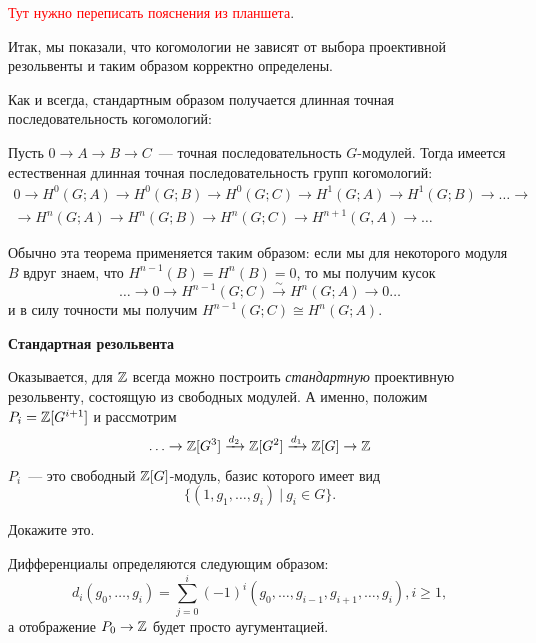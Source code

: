 	\begin{remark}
		\textcolor{red}{Тут нужно переписать пояснения из планшета}.
	\end{remark}

	Итак, мы показали, что когомологии не зависят от выбора проективной резольвенты и таким образом корректно определены. 

	Как и всегда, стандартным образом получается длинная точная последовательность когомологий: 

	\begin{theorem} 
		Пусть $0 \to A \to B \to C$~--- точная последовательность $G$-модулей. Тогда имеется естественная длинная точная последовательность групп когомологий:
		\begin{multline*}
			0 \to H^{0}(G; A) \to H^{0}(G; B) \to H^{0}(G; C) \to H^{1}(G; A) \to H^{1}(G; B) \to \ldots \to \\ \to H^{n}(G; A) \to H^{n}(G; B) \to H^{n}(G; C) \to H^{n + 1}(G, A) \to \ldots
		\end{multline*}
	\end{theorem}


	\begin{remark}
		Обычно эта теорема применяется таким образом: если мы для некоторого модуля $B$ вдруг знаем, что 
		$H^{n - 1}(B) = H^{n}(B) = 0$, то мы получим кусок 
		\[
			\ldots \to 0 \to H^{n - 1}(G; C) \xrightarrow{\sim} H^{n}(G; A) \to 0 \ldots 
		\]
		и в силу точности мы получим $H^{n - 1}(G; C) \cong H^{n}(G; A)$.
	\end{remark}
 
 	\noindent\bf{Стандартная резольвента}

 	Оказывается, для $\mathbb{Z}$ всегда можно построить \emph{стандартную} проективную резольвенту, состоящую из свободных модулей. А именно, положим $P_i = \mathbb{Z}[G^{i + 1}]$ и рассмотрим 
 	\[
 		\ldots \to \mathbb{Z}[G^3] \xrightarrow{d_2} \mathbb{Z}[G^2] \xrightarrow{d_1} \mathbb{Z}[G] \to \mathbb{Z}
 	\]
 	 $P_i$~--- это свободный $\mathbb{Z}[G]$-модуль, базис которого имеет вид 
 	\[
 		\{ (1, g_1, \ldots, g_{i}) \ \vert \ g_i \in G \}.
 	\]

 		\begin{exercise}
 				Докажите это.  
 			\end{exercise}	
 	Дифференциалы определяются следующим образом: 
 	\[
 		d_i(g_0, \ldots, g_i) = \sum_{j = 0}^{i} (-1)^i (g_0, \ldots, g_{i - 1}, g_{i + 1}, \ldots, g_i), i \ge 1,
	\]		
	а отображение $P_0 \to \mathbb{Z}$ будет просто аугументацией. 

